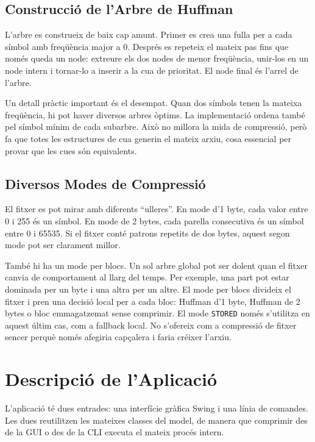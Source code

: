 \documentclass[conference,compsoc]{IEEEtran}
\begin{document}
\subsection{Construcció de l'Arbre de Huffman}

L'arbre es construeix de baix cap amunt. Primer es crea una fulla per a
cada símbol amb freqüència major a 0. Després es repeteix el mateix pas
fins que només queda un node: extreure els dos nodes de menor freqüència,
unir-los en un node intern i tornar-lo a inserir a la cua de prioritat.
El node final és l'arrel de l'arbre.

Un detall pràctic important és el desempat. Quan dos símbols tenen la
mateixa freqüència, hi pot haver diversos arbres òptims. La implementació
ordena també pel símbol mínim de cada subarbre. Això no millora la mida
de compressió, però fa que totes les estructures de cua generin el mateix
arxiu, cosa essencial per provar que les cues són equivalents.

\subsection{Diversos Modes de Compressió}

El fitxer es pot mirar amb diferents ``ulleres''. En mode d'1 byte, cada
valor entre 0 i 255 és un símbol. En mode de 2 bytes, cada parella
consecutiva és un símbol entre 0 i 65535. Si el fitxer conté patrons
repetits de dos bytes, aquest segon mode pot ser clarament millor.

També hi ha un mode per blocs. Un sol arbre global pot ser dolent quan
el fitxer canvia de comportament al llarg del temps. Per exemple, una
part pot estar dominada per un byte i una altra per un altre. El mode per
blocs divideix el fitxer i pren una decisió local per a cada bloc:
Huffman d'1 byte, Huffman de 2 bytes o bloc emmagatzemat sense comprimir.
El mode \texttt{STORED} només s'utilitza en aquest últim cas, com a
fallback local. No s'ofereix com a compressió de fitxer sencer perquè
només afegiria capçalera i faria créixer l'arxiu.

\section{Descripció de l'Aplicació}

L'aplicació té dues entrades: una interfície gràfica Swing i una línia
de comandes. Les dues reutilitzen les mateixes classes del model, de
manera que comprimir des de la GUI o des de la CLI executa el mateix
procés intern.
\end{document}
